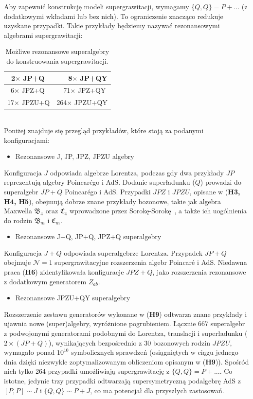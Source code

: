 \documentclass[12pt,a4paper]{article}
\begin{document}
Aby zapewnić konstrukcję modeli supergrawitacji, wymagamy $\{Q, Q\}= P+...$ (z dodatkowymi wkładami lub bez nich). To ograniczenie znacząco redukuje uzyskane przypadki. Takie przykłady będziemy nazywać rezonansowymi algebrami supergrawitacji:
\begin{table}[h!]
	\label{table-supergravityalgebras}
	\begin{center}
		\begin{tabular}{l|l}
			~2$\times$ JP+Q & ~~~8$\times$ JP+QY    \\ \hline
			~6$\times$ JPZ+Q  & ~~71$\times$ JPZ+QY  \\ \hline
			17$\times$ JPZU+Q & 264$\times$ JPZU+QY
		\end{tabular}
		\caption[]{Możliwe rezonansowe superalgebry do konstruowania supergrawitacji.}
	\end{center}
\end{table}
\\
Poniżej znajduje się przegląd przykładów, które stoją za podanymi konfiguracjami:
\begin{itemize}
	\item Rezonansowe J, JP, JPZ, JPZU algebry
\end{itemize}
Konfiguracja $J$ odpowiada algebrze Lorentza, podczas gdy dwa przykłady $JP$ reprezentują algebry Poincar\'ego i AdS. Dodanie superładunku ($Q$) prowadzi do superalgebr $JP+Q$ Poincar\'ego i AdS. Przypadki $JPZ$ i $JPZU$, opisane w (\textbf{H3, H4, H5}), obejmują dobrze znane przykłady bozonowe, takie jak algebra Maxwella $\mathfrak{B}_{4}$ \cite{Bacry:1970ye, Schrader:1972zd} oraz $\mathfrak{C}_{4}$ wprowadzone przez Sorokę-Sorokę~\cite{Soroka:2006aj, Durka:2011nf, Salgado:2013eut}, a także ich uogólnienia do rodzin $\mathfrak{B}_{m}$ i $\mathfrak{C}_{m}$.
\begin{itemize}
	\item Rezonansowe J+Q, JP+Q, JPZ+Q superalgebry
\end{itemize}
Konfiguracja $J+Q$ odpowiada superalgebrze Lorentza. Przypadek $JP+Q$ obejmuje $\mathcal{N}=1$ supergrawitacyjne rozszerzenia algebr Poincar\'e i AdS. Niedawna praca (\textbf{H6}) zidentyfikowała konfiguracje $JPZ+Q$, jako rozszerzenia rezonansowe z dodatkowym generatorem $Z_{ab}$.
\begin{itemize}
	\item Rezonansowe JPZU+QY superalgebry
\end{itemize}
 Rozszerzenie zestawu generatorów wykonane w (\textbf{H9}) odtwarza znane przykłady i ujawnia nowe (super)algebry, wyróżnione pogrubieniem. Łącznie 667 superalgebr z podwojonymi generatorami podobnymi do Lorentza, translacji i superładunku ($2 \times (JP+Q)$), wynikających bezpośrednio z 30 bozonowych rodzin $JPZU$, wymagało ponad $10^{10}$ symbolicznych sprawdzeń (osiągniętych w ciągu jednego dnia dzięki niezwykle zoptymalizowanym obliczeniom opisanym w (\textbf{H9})). Spośród nich tylko 264 przypadki umożliwiają supergrawitację z $\{Q, Q\} = P+...$. Co istotne, jedynie trzy przypadki odtwarzają supersymetryczną podalgebrę AdS z $[P, P] \sim J$ i $\{Q, Q\} \sim P+J$, co ma potencjał dla przyszłych zastosowań.
\end{document}
